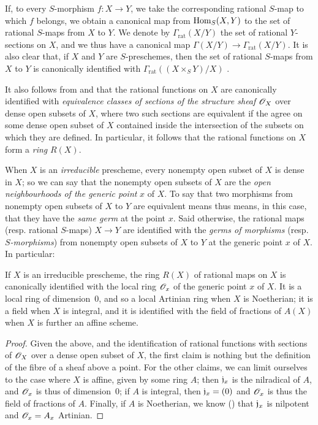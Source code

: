 If, to every $S$-morphism $f:X\to Y$, we take the corresponding rational $S$-map to which $f$ belongs, we obtain a canonical map from ${\mathop{\mathrm{Hom}}\nolimits}_S(X,Y)$ to the set of rational $S$-maps from $X$ to $Y$.
We denote by $\Gamma_\mathrm{rat}(X/Y)$ the set of rational $Y$-sections on $X$, and we thus have a canonical map $\Gamma(X/Y)\to\Gamma_\mathrm{rat}(X/Y)$.
It is also clear that, if $X$ and $Y$ are $S$-preschemes, then the set of rational $S$-maps from $X$ to $Y$ is canonically identified with $\Gamma_\mathrm{rat}((X\times_S Y)/X)$ .

\begin{env}[7.1.3]
\label{1.7.1.3}
It also follows from  and  that the rational functions on $X$ are canonically identified with \emph{equivalence classes of sections of the structure sheaf $\mathscr{O}_X$} over dense open subsets of $X$, where two such sections are equivalent if the agree on some dense open subset of $X$ contained inside the intersection of the subsets on which they are defined.
In particular, it follows that the rational functions on $X$ form a \emph{ring} $R(X)$.
\end{env}

\begin{env}[7.1.4]
\label{1.7.1.4}
When $X$ is an \emph{irreducible} prescheme, every nonempty open subset of $X$ is dense in $X$; so we can say that the nonempty open subsets of $X$ are the \emph{open neighbourhoods of the generic point} $x$ of $X$.
To say that two morphisms from nonempty open subsets of $X$ to $Y$ are equivalent means thus means, in this case, that they have the \emph{same germ} at the point $x$.
Said otherwise, the rational maps (resp. rational $S$-maps) $X\to Y$ are identified with the \emph{germs of morphisms} (resp. \emph{$S$-morphisms}) from nonempty open subsets of $X$ to $Y$ at the generic point $x$ of $X$.
In particular:
\end{env}

\begin{prop}[7.1.5]
\label{1.7.1.5}
If $X$ is an irreducible prescheme, the ring $R(X)$ of rational maps on $X$ is canonically identified with the local ring $\mathscr{O}_x$ of the generic point $x$ of $X$.
It is a local ring of dimension~0, and so a local Artinian ring when $X$ is Noetherian; it is a field when $X$ is integral, and it is identified with the field of fractions of $A(X)$ when $X$ is further an affine scheme.
\end{prop}

\begin{proof}
\label{proof-1.7.1.5}
Given the above, and the identification of rational functions with sections of $\mathscr{O}_X$ over a dense open subset of $X$, the first claim is nothing but the definition of the fibre of a sheaf above a point.
For the other claims, we can limit ourselves to the case where $X$ is affine, given by some ring $A$; then $\mathfrak{j}_x$ is the nilradical of $A$, and $\mathscr{O}_x$ is thus of dimension~0; if $A$ is integral, then $\mathfrak{j}_x=(0)$ and $\mathscr{O}_x$ is thus the field of fractions of $A$.
Finally, if $A$ is Noetherian, we know (\cite[p.~127, cor.~4]{I-11}) that $\mathfrak{j}_x$ is nilpotent and $\mathscr{O}_x=A_x$ Artinian.
\end{proof}


